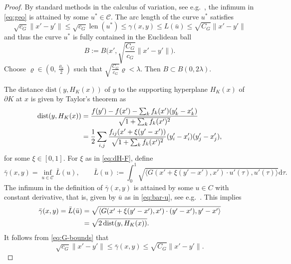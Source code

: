 \documentclass[a4paper,12pt,reqno]{amsart}
\theoremstyle{definition}
\newcommand{\dist}{\mathrm{dist}}
\DeclareMathOperator{\len}{len}
\newcommand{\curv}{\mathcal{C}}
\newcommand{\dd}{\mathrm{d}}
\begin{document}
\begin{proof}
By standard methods in the calculus of variation, see e.g.~\cite[Chapter 7]{Dac25},  the infimum in \eqref{eq:geo} is attained by some $u^*\in \curv$.  The arc length of the curve $u^*$ satisfies
\begin{equation} \label{eq:arc-min}
	\sqrt{c_G}\|x'-y'\|
	\le \sqrt{c_G}\len(u^*)
\le \gamma(x,y)
\le L(\bar{u})
\le \sqrt{C_G}\|x'-y'\|
\end{equation}
and thus the curve $u^*$ is fully contained in the Euclidean ball
\begin{equation} \label{eq:ball-x-y}
	B:=B\Big(x',\sqrt{\frac{C_G}{c_G}}\|x'-y'\|\Big).
\end{equation}
Choose $\varrho\in (0,\frac{\varrho_0}{2})$ such that $\sqrt{\frac{C_G}{c_G}}\varrho<\lambda$. Then $B\subset B(0,2\lambda)$. 

The distance $\dist(y,H_K(x))$ of $y$ to the supporting hyperplane $H_K(x)$ of $\partial K$ at $x$ is given by Taylor's theorem as
\begin{align} \label{eq:dH-F}
\dist(y,H_K(x))
&=\frac{f(y')-f(x')-\sum_{k}f_k(x')(y'_k-x'_k)}{\sqrt{1+\sum_{k}f_k(x')^2}}\notag \\
&= \frac{1}{2}\sum_{i,j}\frac{f_{ij}(x'+\xi(y'-x'))}{\sqrt{1+\sum_{k}f_k(x')^2}}(y'_i-x'_i)(y'_j-x'_j),
\end{align}
for some $\xi\in [0,1]$. For $\xi$ as in \eqref{eq:dH-F}, define 
\begin{equation} \label{eq:geo-bar}
\bar{\gamma}(x,y)
=\inf_{u\in \curv} \bar{L}(u),
\qquad
\bar{L}(u):=\int_0^1 \sqrt{\langle G(x'+\xi(y'-x'),x')\cdot u'(\tau),u'(\tau)\rangle} \dd \tau.
\end{equation}
The infimum in the definition of $\bar{\gamma}(x,y)$ is attained by some $u\in C$ with constant derivative, that is, given by $\bar{u}$ as in \eqref{eq:bar-u}, see e.g.~\cite[Chapter 7]{Dac25}. This implies 
\begin{align}\label{eq:gamma-bar}
\bar{\gamma}(x,y)
=\bar{L}(\bar{u})
&=\sqrt{\langle G(x'+\xi(y'-x'),x')\cdot (y'-x'),y'-x'\rangle}\notag\\
&=\sqrt{2\,\dist(y,H_K(x))}.	
\end{align}
It follows from \eqref{eq:G-bounds} that
\begin{equation} \label{eq:gamma-bar-bound}
	\sqrt{c_G}\|x'-y'\|
	\le \bar{\gamma}(x,y) 
	\le \sqrt{C_G}\|x'-y'\|.
\end{equation}


\end{proof}
\end{document}
